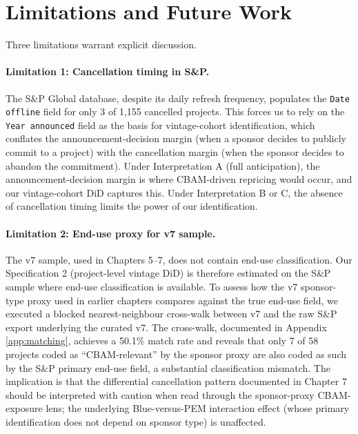 \documentclass[11pt,a4paper]{article}
\begin{document}
\section{Limitations and Future Work}
\label{sec:ch8-limitations}

Three limitations warrant explicit discussion.

\paragraph{Limitation 1: Cancellation timing in S\&P.}
The S\&P Global database, despite its daily refresh frequency, populates the \texttt{Date offline} field for only 3 of 1{,}155 cancelled projects. This forces us to rely on the \texttt{Year announced} field as the basis for vintage-cohort identification, which conflates the announcement-decision margin (when a sponsor decides to publicly commit to a project) with the cancellation margin (when the sponsor decides to abandon the commitment). Under Interpretation A (full anticipation), the announcement-decision margin is where CBAM-driven repricing would occur, and our vintage-cohort DiD captures this. Under Interpretation B or C, the absence of cancellation timing limits the power of our identification.

\paragraph{Limitation 2: End-use proxy for v7 sample.}
The v7 sample, used in Chapters 5--7, does not contain end-use classification. Our Specification 2 (project-level vintage DiD) is therefore estimated on the S\&P sample where end-use classification is available. To assess how the v7 sponsor-type proxy used in earlier chapters compares against the true end-use field, we executed a blocked nearest-neighbour cross-walk between v7 and the raw S\&P export underlying the curated v7. The cross-walk, documented in Appendix \ref{app:matching}, achieves a 50.1\% match rate and reveals that only 7 of 58 projects coded as ``CBAM-relevant'' by the sponsor proxy are also coded as such by the S\&P primary end-use field, a substantial classification mismatch. The implication is that the differential cancellation pattern documented in Chapter 7 should be interpreted with caution when read through the sponsor-proxy CBAM-exposure lens; the underlying Blue-versus-PEM interaction effect (whose primary identification does not depend on sponsor type) is unaffected.
\end{document}
